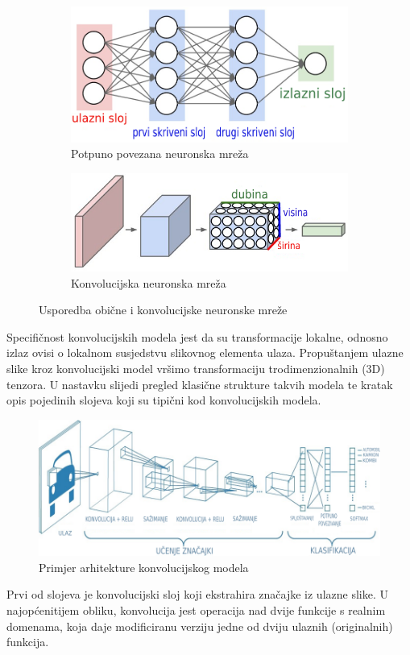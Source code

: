\documentclass[times, utf8, diplomski]{fer}
\theoremstyle{definition}
\begin{document}
\begin{figure}[h]
\centering
\begin{subfigure}{.5\textwidth}
\centering
\includegraphics[width=\linewidth]{neural_net2.png}
\caption{Potpuno povezana neuronska mreža}
\label{fig:sub1}
\end{subfigure}%
\begin{subfigure}{.5\textwidth}
\centering
\includegraphics[width=\linewidth]{cnn.png}
\caption{Konvolucijska neuronska mreža}
\label{fig:sub2}
\end{subfigure}
\caption{Usporedba obične i konvolucijske neuronske mreže}
\label{fig:test}
\end{figure}

Specifičnost konvolucijskih modela jest da su transformacije lokalne, odnosno izlaz ovisi o lokalnom susjedstvu slikovnog elementa ulaza. Propuštanjem ulazne slike kroz konvolucijski model vršimo transformaciju trodimenzionalnih (3D) tenzora. U nastavku slijedi pregled klasične strukture takvih modela te kratak opis pojedinih slojeva koji su tipični kod konvolucijskih modela.
\begin{figure}
\centering
\includegraphics[scale=0.64]{architecture.png}
\caption{Primjer arhitekture konvolucijskog modela}
\end{figure}
\newpage Prvi od slojeva je konvolucijski sloj koji ekstrahira značajke iz ulazne slike. U najopćenitijem obliku, konvolucija jest operacija nad dvije funkcije s realnim domenama, koja daje modificiranu verziju jedne od dviju ulaznih (originalnih) funkcija.
\end{document}
